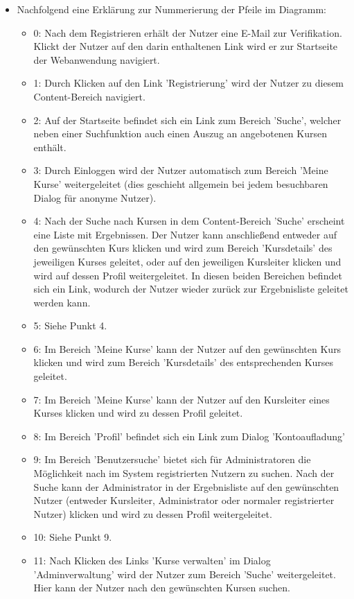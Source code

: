 \documentclass[a4paper]{scrreprt}
\begin{document}
\begin{itemize}
	    \item Nachfolgend eine Erklärung zur Nummerierung der Pfeile im Diagramm:
	    
	    \begin{itemize}
	    \item 0: Nach dem Registrieren erhält der Nutzer eine E-Mail zur Verifikation. Klickt der Nutzer auf den darin enthaltenen Link wird er zur Startseite der Webanwendung navigiert.
	    \item 1: Durch Klicken auf den Link 'Registrierung' wird der Nutzer zu diesem Content-Bereich navigiert.
	    \item 2: Auf der Startseite befindet sich ein Link zum Bereich 'Suche', welcher neben einer Suchfunktion auch einen Auszug an angebotenen Kursen enthält.
	    \item 3: Durch Einloggen wird der Nutzer automatisch zum Bereich 'Meine Kurse' weitergeleitet (dies geschieht allgemein bei jedem besuchbaren Dialog für anonyme Nutzer).
	    \item 4: Nach der Suche nach Kursen in dem Content-Bereich 'Suche' erscheint eine Liste mit Ergebnissen. Der Nutzer kann anschließend entweder auf den gewünschten Kurs klicken und wird zum Bereich 'Kursdetails' des jeweiligen Kurses geleitet, oder auf den jeweiligen Kursleiter klicken und wird auf dessen Profil weitergeleitet. In diesen beiden Bereichen befindet sich ein Link, wodurch der Nutzer wieder zurück zur Ergebnisliste geleitet werden kann.
	    \item 5: Siehe Punkt 4.
	    \item 6: Im Bereich 'Meine Kurse' kann der Nutzer auf den gewünschten Kurs klicken und wird zum Bereich 'Kursdetails' des entsprechenden Kurses geleitet.
	    \item 7: Im Bereich 'Meine Kurse' kann der Nutzer auf den Kursleiter eines Kurses klicken und wird zu dessen Profil geleitet.
	    \item 8: Im Bereich 'Profil' befindet sich ein Link zum Dialog 'Kontoaufladung'
	    \item 9: Im Bereich 'Benutzersuche' bietet sich für Administratoren die Möglichkeit nach im System registrierten Nutzern zu suchen. Nach der Suche kann der Administrator in der Ergebnisliste auf den gewünschten Nutzer (entweder Kursleiter, Administrator oder normaler registrierter Nutzer) klicken und wird zu dessen Profil weitergeleitet.
	    \item 10: Siehe Punkt 9.
	    \item 11: Nach Klicken des Links 'Kurse verwalten' im Dialog 'Adminverwaltung' wird der Nutzer zum Bereich 'Suche' weitergeleitet. Hier kann der Nutzer nach den gewünschten Kursen suchen.

\end{itemize}
\end{itemize}
\end{document}
